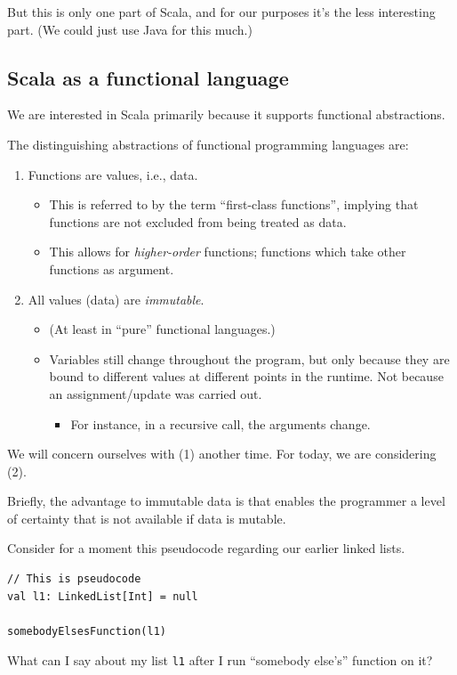 \documentclass[11pt]{article}
\begin{document}
But this is only one part of Scala,
and for our purposes it's the less interesting part.
(We could just use Java for this much.)

\subsection{Scala as a functional language}
\label{sec:orgdf45b44}

We are interested in Scala primarily because it supports
functional abstractions.

The distinguishing abstractions of
functional programming languages are:
\begin{enumerate}
\item Functions are values, i.e., data.
\begin{itemize}
\item This is referred to by the term “first-class functions”,
implying that functions are not excluded
from being treated as data.
\item This allows for \emph{higher-order} functions;
functions which take other functions as argument.
\end{itemize}
\item All values (data) are \emph{immutable}.
\begin{itemize}
\item (At least in “pure” functional languages.)
\item Variables still change throughout the program,
but only because they are bound to different values
at different points in the runtime.
Not because an assignment/update was carried out.
\begin{itemize}
\item For instance, in a recursive call, the arguments change.
\end{itemize}
\end{itemize}
\end{enumerate}

We will concern ourselves with (1) another time.
For today, we are considering (2).

Briefly, the advantage to immutable data is that
enables the programmer a level of certainty that is not available
if data is mutable.

Consider for a moment this pseudocode regarding our earlier linked lists.
\begin{verbatim}
// This is pseudocode
val l1: LinkedList[Int] = null

somebodyElsesFunction(l1)
\end{verbatim}
What can I say about my list \texttt{l1} after I run “somebody else's”
function on it?
\end{document}
